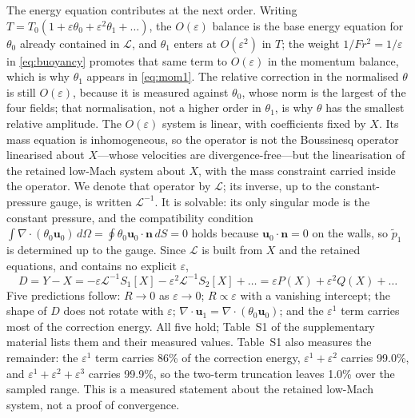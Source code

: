 \documentclass[preprint,11pt,a4paper,times,doubleblind]{elsarticle}
\begin{document}
The energy equation contributes at the next order. Writing
$T=T_0(1+\varepsilon\theta_0+\varepsilon^2\theta_1+\dots)$, the $O(\varepsilon)$ balance is the base
energy equation for $\theta_0$ already contained in $\mathcal{L}$, and $\theta_1$ enters at
$O(\varepsilon^2)$ in $T$; the weight $1/Fr^2=1/\varepsilon$ in \eqref{eq:buoyancy} promotes that
same term to $O(\varepsilon)$ in the momentum balance, which is why $\theta_1$ appears in
\eqref{eq:mom1}. The relative correction in the normalised $\theta$ is still
$O(\varepsilon)$, because it is measured against $\theta_0$, whose norm is the largest of the four
fields; that normalisation, not a higher order in $\theta_1$, is why $\theta$ has the smallest
relative amplitude. The
$O(\varepsilon)$ system is linear, with coefficients fixed by $X$. Its mass equation is
inhomogeneous, so the operator is not the Boussinesq operator linearised about $X$---whose
velocities are divergence-free---but the linearisation of the retained low-Mach system about $X$,
with the mass constraint carried inside the operator. We denote that operator by $\mathcal{L}$;
its inverse, up to the constant-pressure gauge, is written $\mathcal{L}^{-1}$. It is solvable: its
only singular mode is the constant pressure, and the compatibility condition
$\int\nabla\cdot(\theta_0\bm u_0)\,d\Omega=\oint\theta_0\bm u_0\cdot\bm n\,dS=0$ holds because
$\bm u_0\cdot\bm n=0$ on the walls, so $\tilde p_1$ is determined up to the gauge.
Since $\mathcal{L}$ is built from $X$ and the retained equations, and contains no explicit
$\varepsilon$,
\begin{equation}
D=Y-X=-\varepsilon \mathcal{L}^{-1}S_1[X]-\varepsilon^2\mathcal{L}^{-1}S_2[X]+\dots
=\varepsilon P(X)+\varepsilon^2Q(X)+\dots
\label{eq:factor}
\end{equation}
Five predictions follow: $R\to0$ as $\varepsilon\to0$; $R\propto\varepsilon$ with a vanishing
intercept; the shape of $D$ does not rotate with $\varepsilon$;
$\nabla\cdot\bm u_1=\nabla\cdot(\theta_0\bm u_0)$; and the $\varepsilon^1$ term carries most of the
correction energy. All five hold; Table~S1 of the supplementary material lists them and their
measured values. Table~S1 also measures the remainder: the $\varepsilon^1$ term carries 86\%
of the correction energy, $\varepsilon^1+\varepsilon^2$ carries 99.0\%, and
$\varepsilon^1+\varepsilon^2+\varepsilon^3$ carries 99.9\%, so the two-term truncation leaves 1.0\%
over the sampled range. This is a measured statement about the retained low-Mach system, not a
proof of convergence.
\end{document}
